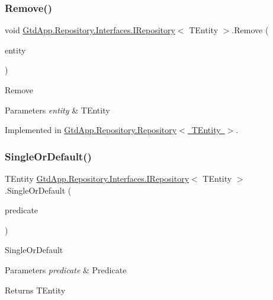 \subsubsection{\texorpdfstring{Remove()}{Remove()}}
{\footnotesize\ttfamily void \mbox{\hyperlink{interface_gtd_app_1_1_repository_1_1_interfaces_1_1_i_repository}{Gtd\+App.\+Repository.\+Interfaces.\+I\+Repository}}$<$ T\+Entity $>$.Remove (\begin{DoxyParamCaption}\item[{T\+Entity}]{entity }\end{DoxyParamCaption})}



Remove 


\begin{DoxyParams}{Parameters}
{\em entity} & T\+Entity\\
\hline
\end{DoxyParams}


Implemented in \mbox{\hyperlink{class_gtd_app_1_1_repository_1_1_repository_a8a1208608bc26394b65892edc3a79fa4}{Gtd\+App.\+Repository.\+Repository$<$ T\+Entity $>$}}.

\mbox{\label{interface_gtd_app_1_1_repository_1_1_interfaces_1_1_i_repository_a82a2f97d2651121365bb7975974dc4a4}} 
\subsubsection{\texorpdfstring{Single\+Or\+Default()}{SingleOrDefault()}}
{\footnotesize\ttfamily T\+Entity \mbox{\hyperlink{interface_gtd_app_1_1_repository_1_1_interfaces_1_1_i_repository}{Gtd\+App.\+Repository.\+Interfaces.\+I\+Repository}}$<$ T\+Entity $>$.Single\+Or\+Default (\begin{DoxyParamCaption}\item[{Expression$<$ Func$<$ T\+Entity, bool $>$$>$}]{predicate }\end{DoxyParamCaption})}



Single\+Or\+Default 


\begin{DoxyParams}{Parameters}
{\em predicate} & Predicate\\
\hline
\end{DoxyParams}
\begin{DoxyReturn}{Returns}
T\+Entity
\end{DoxyReturn}


